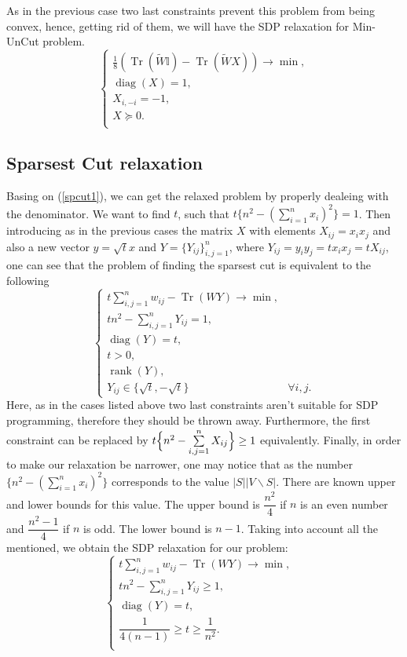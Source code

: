 \documentclass[12pt]{article}
\DeclareMathOperator{\trace}{Tr}
\DeclareMathOperator{\diag}{diag}
\DeclareMathOperator{\rank}{rank}
\begin{document}
As in the previous case two last constraints prevent this problem from being convex, 
hence, getting rid of them, we will have the SDP relaxation for Min-UnCut problem.
\begin{equation}
\label{minuncut_rel}
\begin{cases}
\frac 18 \left(\trace(\tilde W \mathbb{I}) - \trace( \tilde W X)\right) \longrightarrow \min,\\
\diag(X) = 1,\\
X_{i, -i} = -1,\\
X \succeq 0.\\
\end{cases}
\end{equation}

\subsection{Sparsest Cut relaxation}

Basing on (\ref{spcut1}), we can get the relaxed problem by properly dealeing with the 
denominator. We want to find $t$, such that $t\Biggl\{ n^2 - \left( \sum\limits_{i=1}^n x_i 
\right)^2\Biggr\} = 1$. Then introducing as in the previous cases the matrix $X$ with 
elements $X_{ij} = x_i x_j$ and also a new vector $y = \sqrt{t} x$ and $Y = \{Y_{ij}\}_{i,j = 
1}^n$, where $Y_{ij} = y_iy_j = tx_ix_j = tX_{ij}$, one can see that the problem of finding 
the sparsest cut is equivalent to the following
\[
\begin{cases}
t \sum\limits_{i,j=1}^n w_{ij} -  \trace(WY) \longrightarrow \min, &\\
t n^2 - \sum\limits_{i,j=1}^n Y_{ij}  = 1, &\\
\diag(Y) = t, & \\
t > 0, &\\
\rank(Y), &\\
Y_{ij} \in \{\sqrt{t}, -\sqrt{t}\} & \forall i,j.
\end{cases}
\]
Here, as in the cases listed above two last constraints aren't suitable for SDP 
programming, therefore they should be thrown away. Furthermore, the first constraint 
can be replaced by $t\Bigl\{ n^2 - \sum\limits_{i,j=1}^n X_{ij} \Bigr\} \geq 1$ equivalently. 
Finally, in order to make our relaxation be narrower, one may notice that as the number 
$\Biggl\{ n^2 - \left( \sum\limits_{i=1}^n x_i \right)^2\Biggr\}$ corresponds to the value 
$|S||V\backslash S|$. There are known upper and lower bounds for this value. The upper 
bound is $\dfrac{n^2}4$ if $n$ is an even number and $\dfrac{n^2-1}4$ if $n$ is odd. 
The lower bound is $n-1$. Taking into account all the mentioned, we obtain the SDP 
relaxation for our problem:
\begin{equation}
\label{spcut_rel}
\begin{cases}
t \sum\limits_{i,j=1}^n w_{ij} -  \trace(WY) \longrightarrow \min, &\\
t n^2 - \sum\limits_{i,j=1}^n Y_{ij} \geq 1, \\
\diag(Y) = t,  \\
\dfrac1{4(n-1)} \geq t \geq \dfrac1{n^2}. \\
\end{cases}
\end{equation}
\end{document}
